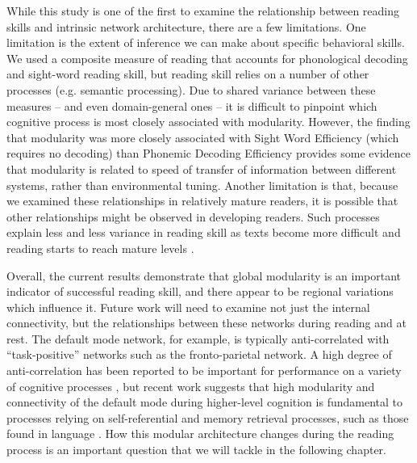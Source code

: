 While this study is one of the first to examine the relationship between reading skills and intrinsic network architecture, there are a few limitations. One limitation is the extent of inference we can make about specific behavioral skills. We used a composite measure of reading that accounts for phonological decoding and sight-word reading skill, but reading skill relies on a number of other processes (e.g. semantic processing). Due to shared variance between these measures -- and even domain-general ones -- it is difficult to pinpoint which cognitive process is most closely associated with modularity. However, the finding that modularity was more closely associated with Sight Word Efficiency (which requires no decoding) than Phonemic Decoding Efficiency provides some evidence that modularity is related to speed of transfer of information between different systems, rather than environmental tuning. Another limitation is that, because we examined these relationships in relatively mature readers, it is possible that other relationships might be observed in developing readers. Such processes explain less and less variance in reading skill as texts become more difficult and reading starts to reach mature levels \citep{Cutting2006a}. 

Overall, the current results demonstrate that global modularity is an important indicator of successful reading skill, and there appear to be regional variations which influence it. Future work will need to examine not just the internal connectivity, but the relationships between these networks during reading and at rest. The default mode network, for example, is typically anti-correlated with ``task-positive'' networks such as the fronto-parietal network. A high degree of anti-correlation has been reported to be important for performance on a variety of cognitive processes \citep{Fox2005, Keller2015}, but recent work suggests that high modularity and connectivity of the default mode during higher-level cognition is fundamental to processes relying on self-referential and memory retrieval processes, such as those found in language \citep{Vatansever2015}. How this modular architecture changes during the reading process is an important question that we will tackle in the following chapter. 
